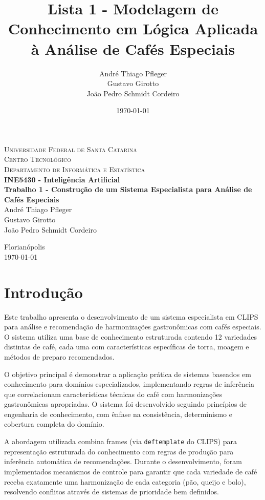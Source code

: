 \documentclass[a4paper,12pt]{article}
\title{Lista 1 - Modelagem de Conhecimento em Lógica Aplicada à Análise de Cafés Especiais}
\author{André Thiago Pfleger \\  Gustavo Girotto \\ João Pedro Schmidt Cordeiro}
\date{\today}
\begin{document}
\begin{titlepage}
   \begin{center}
      \textsc{Universidade Federal de Santa Catarina} \\
      \textsc{Centro Tecnológico} \\
      \textsc{Departamento de Informática e Estatística} \\[4cm]

      \textbf{\Large{INE5430 - Inteligência Artificial}} \\[2cm]

      \textbf{\huge{Trabalho 1 - Construção de um Sistema Especialista para Análise de Cafés Especiais}} \\[3cm]

      André Thiago Pfleger \\
      Gustavo Girotto \\
      João Pedro Schmidt Cordeiro \\
      
      \vfill
      
      {Florianópolis} \\
      {\today}
   \end{center}
\end{titlepage}

\section{Introdução}

Este trabalho apresenta o desenvolvimento de um sistema especialista em CLIPS para análise e recomendação de harmonizações gastronômicas com cafés especiais. O sistema utiliza uma base de conhecimento estruturada contendo 12 variedades distintas de café, cada uma com características específicas de torra, moagem e métodos de preparo recomendados.

O objetivo principal é demonstrar a aplicação prática de sistemas baseados em conhecimento para domínios especializados, implementando regras de inferência que correlacionam características técnicas do café com harmonizações gastronômicas apropriadas. O sistema foi desenvolvido seguindo princípios de engenharia de conhecimento, com ênfase na consistência, determinismo e cobertura completa do domínio.

A abordagem utilizada combina frames (via \texttt{deftemplate} do CLIPS) para representação estruturada do conhecimento com regras de produção para inferência automática de recomendações. Durante o desenvolvimento, foram implementados mecanismos de controle para garantir que cada variedade de café receba exatamente uma harmonização de cada categoria (pão, queijo e bolo), resolvendo conflitos através de sistemas de prioridade bem definidos.
\end{document}
